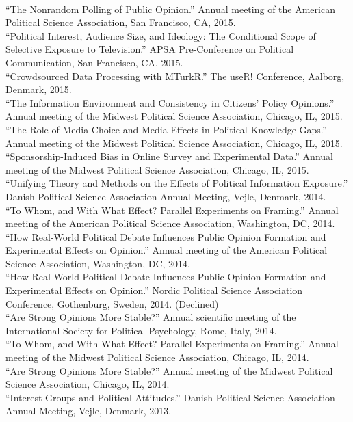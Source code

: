 \documentclass[12pt]{article}
\renewcommand{\section}[1]{\pagebreak[3]%
    \llap{\scshape\smash{\parbox[t]{\marginparwidth}{\raggedright {\color{lg}#1}}}}%
    \vspace{-\baselineskip}\par}
\newcommand{\topic}[1]{\pagebreak[3]\indent {\color{lg}{\footnotesize #1 }}\\}
\newcommand{\entry}[1]{\indent {\color{lg}\guillemotright}\hspace{2pt}#1\vspace{.25em}\\}
\begin{document}
\section{Conference\\Papers\\and\\Invited\\Presentations}
\topic{Conference Papers}
\entry{``The Nonrandom Polling of Public Opinion.'' Annual meeting of the American Political Science Association, San Francisco, CA, 2015.}
\entry{``Political Interest, Audience Size, and Ideology: The Conditional Scope of Selective Exposure to Television.'' APSA Pre-Conference on Political Communication, San Francisco, CA, 2015.}
\entry{``Crowdsourced Data Processing with MTurkR.'' The useR! Conference, Aalborg, Denmark, 2015.}
\entry{``The Information Environment and Consistency in Citizens' Policy Opinions.'' Annual meeting of the Midwest Political Science Association, Chicago, IL, 2015.}
\entry{``The Role of Media Choice and Media Effects in Political Knowledge Gaps.'' Annual meeting of the Midwest Political Science Association, Chicago, IL, 2015.}
\entry{``Sponsorship-Induced Bias in Online Survey and Experimental Data.'' Annual meeting of the Midwest Political Science Association, Chicago, IL, 2015.}
\entry{``Unifying Theory and Methods on the Effects of Political Information Exposure.'' Danish Political Science Association Annual Meeting, Vejle, Denmark, 2014.}
\entry{``To Whom, and With What Effect? Parallel Experiments on Framing.'' Annual meeting of the American Political Science Association, Washington, DC, 2014.}
\entry{``How Real-World Political Debate Influences Public Opinion Formation and Experimental Effects on Opinion.'' Annual meeting of the American Political Science Association, Washington, DC, 2014.}
\entry{``How Real-World Political Debate Influences Public Opinion Formation and Experimental Effects on Opinion.'' Nordic Political Science Association Conference, Gothenburg, Sweden, 2014. (Declined)}
\entry{``Are Strong Opinions More Stable?'' Annual scientific meeting of the International Society for Political Psychology, Rome, Italy, 2014.}
\entry{``To Whom, and With What Effect? Parallel Experiments on Framing.'' Annual meeting of the Midwest Political Science Association, Chicago, IL, 2014.}
\entry{``Are Strong Opinions More Stable?'' Annual meeting of the Midwest Political Science Association, Chicago, IL, 2014.}
\entry{``Interest Groups and Political Attitudes.'' Danish Political Science Association Annual Meeting, Vejle, Denmark, 2013.}
\end{document}
